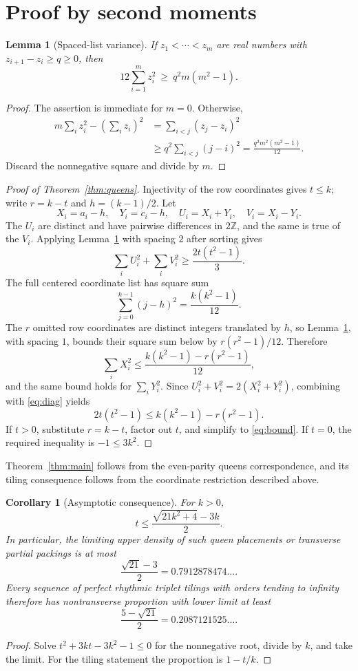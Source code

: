 \documentclass[11pt]{article}
\newtheorem{lemma}[theorem]{Lemma}
\newtheorem{corollary}[theorem]{Corollary}
\newcommand{\Z}{\mathbb Z}
\begin{document}
\section{Proof by second moments}
\begin{lemma}[Spaced-list variance]\label{lem:variance}
If $z_1<\cdots<z_m$ are real numbers with $z_{i+1}-z_i\geq q\geq0$, then
\[
12\sum_{i=1}^m z_i^2\ \geq\ q^2m(m^2-1).
\]
\end{lemma}
\begin{proof}
The assertion is immediate for $m=0$. Otherwise,
\begin{align*}
m\sum_i z_i^2-\left(\sum_i z_i\right)^2
&=\sum_{i<j}(z_j-z_i)^2\\
&\geq q^2\sum_{i<j}(j-i)^2
=\frac{q^2m^2(m^2-1)}{12}.
\end{align*}
Discard the nonnegative square and divide by $m$.
\end{proof}

\begin{proof}[Proof of Theorem~\ref{thm:queens}]
Injectivity of the row coordinates gives $t\leq k$; write $r=k-t$ and $h=(k-1)/2$. Let
\[
X_i=a_i-h,\quad Y_i=c_i-h,\quad U_i=X_i+Y_i,\quad V_i=X_i-Y_i.
\]
The $U_i$ are distinct and have pairwise differences in $2\Z$, and the same is true of the $V_i$. Applying Lemma~\ref{lem:variance} with spacing $2$ after sorting gives
\begin{equation}\label{eq:diag}
\sum_i U_i^2+\sum_i V_i^2\geq \frac{2t(t^2-1)}{3}.
\end{equation}
The full centered coordinate list has square sum
\[
\sum_{j=0}^{k-1}(j-h)^2=\frac{k(k^2-1)}{12}.
\]
The $r$ omitted row coordinates are distinct integers translated by $h$, so Lemma~\ref{lem:variance}, with spacing $1$, bounds their square sum below by $r(r^2-1)/12$. Therefore
\[
\sum_i X_i^2\leq \frac{k(k^2-1)-r(r^2-1)}{12},
\]
and the same bound holds for $\sum_iY_i^2$. Since $U_i^2+V_i^2=2(X_i^2+Y_i^2)$, combining with \eqref{eq:diag} yields
\[
2t(t^2-1)\leq k(k^2-1)-r(r^2-1).
\]
If $t>0$, substitute $r=k-t$, factor out $t$, and simplify to \eqref{eq:bound}. If $t=0$, the required inequality is $-1\leq3k^2$.
\end{proof}
Theorem~\ref{thm:main} follows from the even-parity queens correspondence, and its tiling consequence follows from the coordinate restriction described above.

\begin{corollary}[Asymptotic consequence]
For $k>0$,
\[
t\leq\frac{\sqrt{21k^2+4}-3k}{2}.
\]
In particular, the limiting upper density of such queen placements or transverse partial packings is at most
\[
\frac{\sqrt{21}-3}{2}=0.7912878474\ldots.
\]
Every sequence of perfect rhythmic triplet tilings with orders tending to infinity therefore has nontransverse proportion with lower limit at least
\[
\frac{5-\sqrt{21}}{2}=0.2087121525\ldots.
\]
\end{corollary}
\begin{proof}
Solve $t^2+3kt-3k^2-1\leq0$ for the nonnegative root, divide by $k$, and take the limit. For the tiling statement the proportion is $1-t/k$.
\end{proof}
\end{document}
